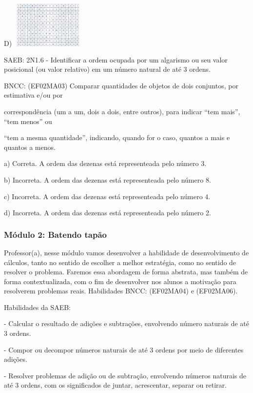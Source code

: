 D) \includegraphics[width=1.45702in,height=0.89583in]{media/image27.png}

SAEB: 2N1.6 - Identificar a ordem ocupada por um algarismo ou seu valor
posicional (ou valor relativo) em um número natural de até 3 ordens.

BNCC: (EF02MA03) Comparar quantidades de objetos de dois conjuntos, por
estimativa e/ou por

correspondência (um a um, dois a dois, entre outros), para indicar ``tem
mais'', ``tem menos'' ou

``tem a mesma quantidade'', indicando, quando for o caso, quantos a mais
e quantos a menos.

a) Correta. A ordem das dezenas está representeada pelo número 3.

b) Incorreta. A ordem das dezenas está representeada pelo número 8.

c) Incorreta. A ordem das dezenas está representeada pelo número 4.

d) Incorreta. A ordem das dezenas está representeada pelo número 2.

\subsubsection{Módulo 2: Batendo
tapão}\label{muxf3dulo-2-batendo-tapuxe3o}

Professor(a), nesse módulo vamos desenvolver a habilidade de
desenvolvimento de cálculos, tanto no sentido de escolher a melhor
estratégia, como no sentido de resolver o problema. Faremos essa
abordagem de forma abstrata, mas também de forma contextualizada, com o
fim de desenvolver nos alunos a motivação para resolverem problemas
reais. Habilidades BNCC: (EF02MA04) e (EF02MA06).

Habilidades da SAEB:

- Calcular o resultado de adições e subtrações, envolvendo número
naturais de até 3 ordens.

- Compor ou decompor números naturais de até 3 ordens por meio de
diferentes adições.

- Resolver problemas de adição ou de subtração, envolvendo números
naturais de até 3 ordens, com os significados de juntar, acrescentar,
separar ou retirar.

